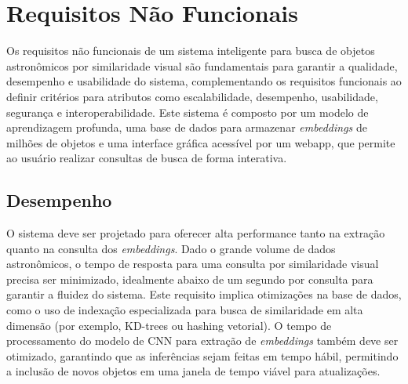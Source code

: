 \section{Requisitos Não Funcionais}
\label{sec:req-nao-funcionais}

Os requisitos não funcionais de um sistema inteligente para busca de objetos astronômicos por similaridade visual são fundamentais para garantir a qualidade, desempenho e usabilidade do sistema, complementando os requisitos funcionais ao definir critérios para atributos como escalabilidade, desempenho, usabilidade, segurança e interoperabilidade. Este sistema é composto por um modelo de aprendizagem profunda, uma base de dados para armazenar \emph{embeddings} de milhões de objetos e uma interface gráfica acessível por um webapp, que permite ao usuário realizar consultas de busca de forma interativa.





\subsection{Desempenho}
\label{sec:req-desempenho}

O sistema deve ser projetado para oferecer alta performance tanto na extração quanto na consulta dos \emph{embeddings}. Dado o grande volume de dados astronômicos, o tempo de resposta para uma consulta por similaridade visual precisa ser minimizado, idealmente abaixo de um segundo por consulta para garantir a fluidez do sistema. Este requisito implica otimizações na base de dados, como o uso de indexação especializada para busca de similaridade em alta dimensão (por exemplo, KD-trees ou hashing vetorial). O tempo de processamento do modelo de CNN para extração de \emph{embeddings} também deve ser otimizado, garantindo que as inferências sejam feitas em tempo hábil, permitindo a inclusão de novos objetos em uma janela de tempo viável para atualizações.







